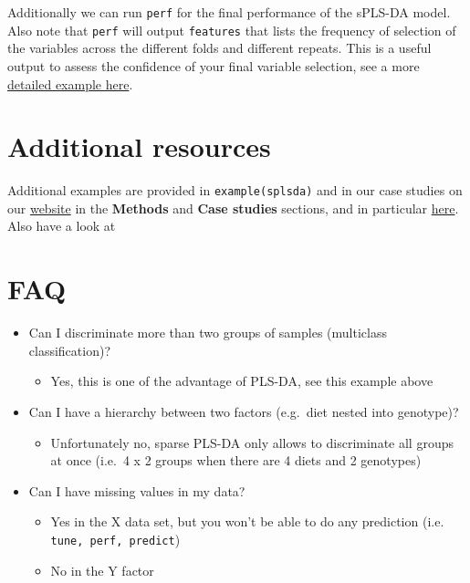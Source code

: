 \documentclass[]{book}
\providecommand{\tightlist}{%
  \setlength{\itemsep}{0pt}\setlength{\parskip}{0pt}}
\begin{document}
Additionally we can run \texttt{perf} for the final performance of the sPLS-DA model. Also note that \texttt{perf} will output \texttt{features} that lists the frequency of selection of the variables across the different folds and different repeats. This is a useful output to assess the confidence of your final variable selection, see a more \href{http://mixomics.org/case-studies/splsda-srbct/}{detailed example here}.

\hypertarget{additional-resources-1}{%
\section{Additional resources}\label{additional-resources-1}}

Additional examples are provided in \texttt{example(splsda)} and in our case studies on our \href{http://www.mixomics.org}{website} in the \textbf{Methods} and \textbf{Case studies} sections, and in particular \href{http://mixomics.org/case-studies/splsda-srbct/}{here}. Also have a look at \citep{Lec11}

\hypertarget{faq-1}{%
\section{FAQ}\label{faq-1}}

\begin{itemize}
\tightlist
\item
  Can I discriminate more than two groups of samples (multiclass classification)?

  \begin{itemize}
  \tightlist
  \item
    Yes, this is one of the advantage of PLS-DA, see this example above
  \end{itemize}
\item
  Can I have a hierarchy between two factors (e.g.~diet nested into genotype)?

  \begin{itemize}
  \tightlist
  \item
    Unfortunately no, sparse PLS-DA only allows to discriminate all groups at once (i.e.~4 x 2 groups when there are 4 diets and 2 genotypes)
  \end{itemize}
\item
  Can I have missing values in my data?

  \begin{itemize}
  \tightlist
  \item
    Yes in the X data set, but you won't be able to do any prediction (i.e. \texttt{tune,\ perf,\ predict})
  \item
    No in the Y factor
  \end{itemize}
\end{itemize}
\end{document}
